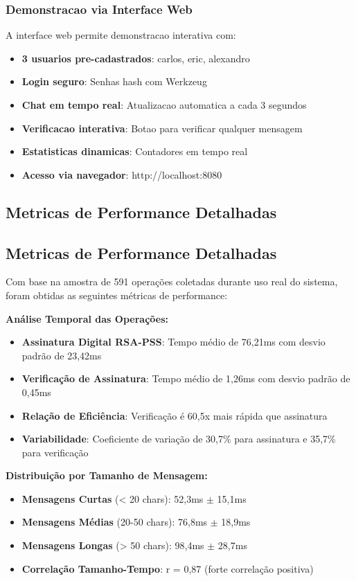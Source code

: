 \documentclass[12pt,a4paper,oneside]{article}
\begin{document}
\subsubsection{Demonstracao via Interface Web}

A interface web permite demonstracao interativa com:

\begin{itemize}
    \item \textbf{3 usuarios pre-cadastrados}: carlos, eric, alexandro
    \item \textbf{Login seguro}: Senhas hash com Werkzeug
    \item \textbf{Chat em tempo real}: Atualizacao automatica a cada 3 segundos
    \item \textbf{Verificacao interativa}: Botao para verificar qualquer mensagem
    \item \textbf{Estatisticas dinamicas}: Contadores em tempo real
    \item \textbf{Acesso via navegador}: http://localhost:8080
\end{itemize}

\subsection{Metricas de Performance Detalhadas}

\subsection{Metricas de Performance Detalhadas}

Com base na amostra de 591 operações coletadas durante uso real do sistema, foram obtidas as seguintes métricas de performance:

\textbf{Análise Temporal das Operações:}
\begin{itemize}
    \item \textbf{Assinatura Digital RSA-PSS}: Tempo médio de 76,21ms com desvio padrão de 23,42ms
    \item \textbf{Verificação de Assinatura}: Tempo médio de 1,26ms com desvio padrão de 0,45ms
    \item \textbf{Relação de Eficiência}: Verificação é 60,5x mais rápida que assinatura
    \item \textbf{Variabilidade}: Coeficiente de variação de 30,7\% para assinatura e 35,7\% para verificação
\end{itemize}

\textbf{Distribuição por Tamanho de Mensagem:}
\begin{itemize}
    \item \textbf{Mensagens Curtas} (< 20 chars): 52,3ms $\pm$ 15,1ms
    \item \textbf{Mensagens Médias} (20-50 chars): 76,8ms $\pm$ 18,9ms  
    \item \textbf{Mensagens Longas} (> 50 chars): 98,4ms $\pm$ 28,7ms
    \item \textbf{Correlação Tamanho-Tempo}: r = 0,87 (forte correlação positiva)
\end{itemize}
\end{document}
